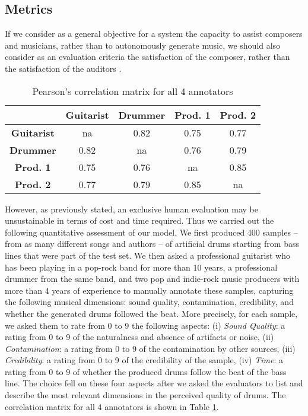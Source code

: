 \documentclass[journal]{IEEEtran}
\begin{document}
\subsection{Metrics}
\label{sec:evaluation}

If we consider as a general objective for a system the capacity to assist composers and musicians, rather than to autonomously generate music, we should also consider as an evaluation criteria the satisfaction of the composer, rather than the satisfaction of the auditors \cite{briot2020deep}.

\begin{table}[]
\begin{center}
\caption{Pearson's correlation matrix for all 4 annotators}
\label{tab:IAA}
\begin{tabular}{c|cccc}
           & \textbf{Guitarist} & \textbf{Drummer} & \textbf{Prod. 1} & \textbf{Prod. 2} \\\hline 
\textbf{Guitarist}  & na        & 0.82       & 0.75         & 0.77            \\ 
\textbf{Drummer}    & 0.82          & na      & 0.76            & 0.79            \\ 
\textbf{Prod. 1} & 0.75           & 0.76         & na         & 0.85            \\ 
\textbf{Prod. 2} & 0.77           & 0.79         & 0.85            & na         \\ 
\end{tabular}
\end{center}
\end{table}

However, as previously stated, an exclusive human evaluation may be unsustainable in terms of cost and time required. Thus we carried out the following quantitative assessment of our model. We first produced 400 %
samples -- from as many different songs and authors -- of artificial drums starting from bass lines that were %
part of the test set. We then asked a professional guitarist who has been playing in a pop-rock band for more than 10 years, a professional drummer from the same band, and two pop and indie-rock music producers with more than 4 years of experience to manually annotate these samples, capturing the following musical dimensions: sound quality, contamination, credibility, and whether the generated drums followed the beat. More precisely, for each sample, we asked them to rate from 0 to 9 the following aspects: (i) \textit{Sound Quality}: a rating from 0 to 9 of the naturalness and absence of artifacts or noise, (ii) \textit{Contamination}: a rating from 0 to 9 of the contamination by other sources, (iii) \textit{Credibility}: a rating from 0 to 9 of the credibility of the sample, (iv) \textit{Time}: a rating from 0 to 9 of whether the produced drums follow the beat of the bass line. The choice fell on these four aspects after we asked the evaluators to list and describe the most relevant dimensions in the perceived quality of drums. The correlation matrix for all 4 annotators is shown in Table \ref{tab:IAA}.
\end{document}
